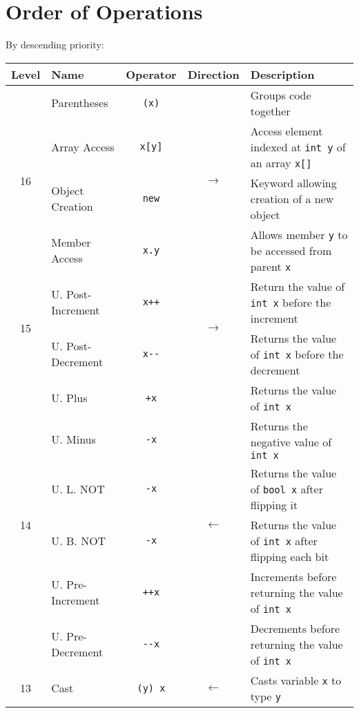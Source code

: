 \documentclass[11pt]{article}
\begin{document}
\section{Order of Operations} 
By descending priority: 
\begin{center}\begin{tabularx}{\textwidth}{clccX}\toprule
  Level               & \quad Name        & Operator          & Direction & \qquad Description \\\midrule
  \multirow{4}{*}{16} & Parentheses       & \lstinline|(x)|   & \multirow{4}{*}{\(\rightarrow\)}& Groups code together \\
                      & Array Access      & \lstinline|x[y]|  & & Access element indexed at \lstinline|int y| of an array \lstinline|x[]|\\
                      & Object Creation   & \lstinline|new|   & & Keyword allowing creation of a new object\\
                      & Member Access     & \lstinline|x.y|   & & Allows member \lstinline|y| to be accessed from parent \lstinline|x| \\ \midrule
  \multirow{2}{*}{15} & U. Post-Increment & \lstinline|x++|   & \multirow{2}{*}{\(\rightarrow\)} & Return the value of \lstinline|int x| before the increment \\
                      & U. Post-Decrement & \lstinline|x--|   & & Returns the value of \lstinline|int x| before the decrement\\\midrule
  \multirow{6}{*}{14} & U. Plus           & \lstinline|+x|    & \multirow{6}{*}{\(\leftarrow\)} & Returns the value of \lstinline|int x|\\
                      & U. Minus          & \lstinline|-x|    & & Returns the negative value of \lstinline|int x| \\
                      & U. L. NOT         & \lstinline|-x|    & & Returns the value of \lstinline|bool x| after flipping it \\
                      & U. B. NOT         & \lstinline|-x|    & & Returns the value of \lstinline|int x| after flipping each bit\\
                      & U. Pre-Increment  & \lstinline|++x|   & & Increments before returning the value of \lstinline|int x| \\
                      & U. Pre-Decrement  & \lstinline|--x|   & & Decrements before returning the value of \lstinline|int x| \\\midrule
                  13  & Cast              & \lstinline|(y) x| & \(\leftarrow\) & Casts variable \lstinline|x| to type \lstinline|y| \\\midrule

\end{tabularx}
\end{center}
\end{document}
